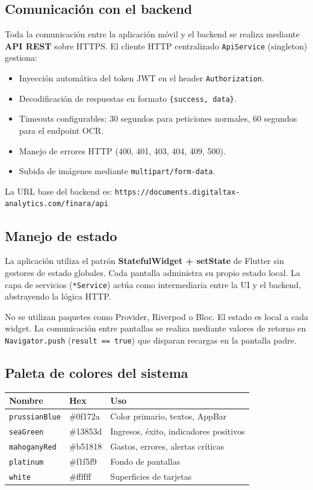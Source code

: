 \documentclass[12pt, letterpaper]{article}
\newcommand{\endpoint}[1]{\texttt{\small\color{azulipn}#1}}
\newcommand{\campo}[1]{\texttt{#1}}
\begin{document}
\subsection{Comunicación con el backend}

Toda la comunicación entre la aplicación móvil y el backend se realiza
mediante \textbf{API REST} sobre HTTPS. El cliente HTTP centralizado
\campo{ApiService} (singleton) gestiona:

\begin{itemize}
  \item Inyección automática del token JWT en el header \campo{Authorization}.
  \item Decodificación de respuestas en formato \campo{\{success, data\}}.
  \item Timeouts configurables: 30 segundos para peticiones normales,
        60 segundos para el endpoint OCR.
  \item Manejo de errores HTTP (400, 401, 403, 404, 409, 500).
  \item Subida de imágenes mediante \campo{multipart/form-data}.
\end{itemize}

La URL base del backend es: \endpoint{https://documents.digitaltax-analytics.com/finara/api}

\subsection{Manejo de estado}

La aplicación utiliza el patrón \textbf{StatefulWidget + setState} de Flutter
sin gestores de estado globales. Cada pantalla administra su propio estado
local. La capa de servicios (\campo{*Service}) actúa como intermediaria entre
la UI y el backend, abstrayendo la lógica HTTP.

\begin{notabox}
  No se utilizan paquetes como Provider, Riverpod o Bloc. El estado es local
  a cada widget. La comunicación entre pantallas se realiza mediante valores
  de retorno en \campo{Navigator.push} (\campo{result == true}) que disparan
  recargas en la pantalla padre.
\end{notabox}

\subsection{Paleta de colores del sistema}

\begin{tabular}{lll}
  \toprule
  \textbf{Nombre} & \textbf{Hex} & \textbf{Uso} \\
  \midrule
  \campo{prussianBlue} & \#0f172a & Color primario, textos, AppBar \\
  \campo{seaGreen}     & \#13853d & Ingresos, éxito, indicadores positivos \\
  \campo{mahoganyRed}  & \#b51818 & Gastos, errores, alertas críticas \\
  \campo{platinum}     & \#f1f5f9 & Fondo de pantallas \\
  \campo{white}        & \#ffffff & Superficies de tarjetas \\
  \bottomrule
\end{tabular}
\end{document}
